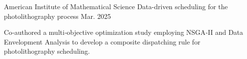 

\begin{cventries}

  \cventry
    {\sloppy American Institute of Mathematical Science}%
    {Data-driven scheduling for the photolithography process} %
    {Mar. 2025} %
    {} %
    {
      \begin{cvitems} %
        \item {Co‑authored a multi‑objective optimization study employing NSGA‑II and Data Envelopment Analysis to develop a composite dispatching rule for photolithography scheduling.}
      \end{cvitems}
    }

\end{cventries}
